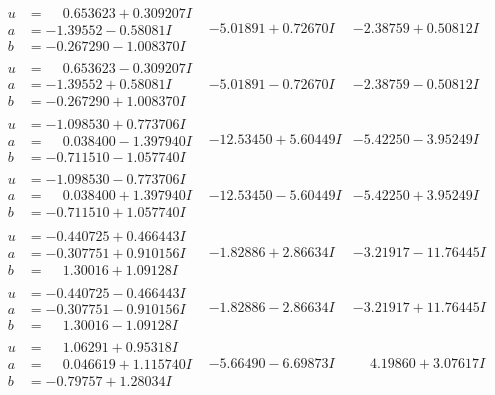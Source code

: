 \documentclass[1p]{elsarticle_modified}
\theoremstyle{definition}
\begin{document}
$$\begin{array}{c|c|c}
\begin{aligned}
u &= \phantom{-}0.653623 + 0.309207 I \\
a &= -1.39552 - 0.58081 I \\
b &= -0.267290 - 1.008370 I\end{aligned}
 & -5.01891 + 0.72670 I & -2.38759 + 0.50812 I \\ \hline\begin{aligned}
u &= \phantom{-}0.653623 - 0.309207 I \\
a &= -1.39552 + 0.58081 I \\
b &= -0.267290 + 1.008370 I\end{aligned}
 & -5.01891 - 0.72670 I & -2.38759 - 0.50812 I \\ \hline\begin{aligned}
u &= -1.098530 + 0.773706 I \\
a &= \phantom{-}0.038400 - 1.397940 I \\
b &= -0.711510 - 1.057740 I\end{aligned}
 & -12.53450 + 5.60449 I & -5.42250 - 3.95249 I \\ \hline\begin{aligned}
u &= -1.098530 - 0.773706 I \\
a &= \phantom{-}0.038400 + 1.397940 I \\
b &= -0.711510 + 1.057740 I\end{aligned}
 & -12.53450 - 5.60449 I & -5.42250 + 3.95249 I \\ \hline\begin{aligned}
u &= -0.440725 + 0.466443 I \\
a &= -0.307751 + 0.910156 I \\
b &= \phantom{-}1.30016 + 1.09128 I\end{aligned}
 & -1.82886 + 2.86634 I & -3.21917 - 11.76445 I \\ \hline\begin{aligned}
u &= -0.440725 - 0.466443 I \\
a &= -0.307751 - 0.910156 I \\
b &= \phantom{-}1.30016 - 1.09128 I\end{aligned}
 & -1.82886 - 2.86634 I & -3.21917 + 11.76445 I \\ \hline\begin{aligned}
u &= \phantom{-}1.06291 + 0.95318 I \\
a &= \phantom{-}0.046619 + 1.115740 I \\
b &= -0.79757 + 1.28034 I\end{aligned}
 & -5.66490 - 6.69873 I & \phantom{-}4.19860 + 3.07617 I \\ \hline\begin{aligned}

\end{aligned}
\end{array}$$
\end{document}
